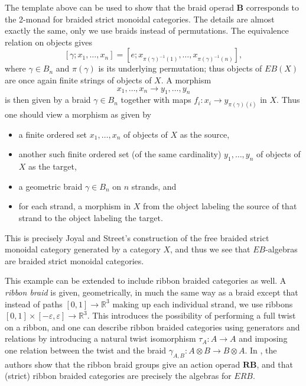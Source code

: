 \documentclass{amsbook} %
\newcommand{\mb}{\mathbf}
\numberwithin{section}{chapter}
\begin{document}
\begin{example}
The template above can be used to show that the braid operad $\mb{B}$ corresponds to the 2-monad for braided strict monoidal categories.  The details are almost exactly the same, only we use braids instead of permutations.  The equivalence relation on objects gives
\[
[\gamma; x_{1}, \ldots, x_{n}] = [e; x_{\pi(\gamma)^{-1}(1)}, \ldots, x_{\pi(\gamma)^{-1}(n)}],
\]
where $\gamma \in B_{n}$ and $\pi(\gamma)$ is its underlying permutation; thus objects of $EB(X)$ are once again finite strings of objects of $X$.  A morphism
\[
x_{1}, \ldots, x_{n} \rightarrow y_{1}, \ldots, y_{n}
\]
is then given by a braid $\gamma \in B_{n}$ together with maps $f_{i}:x_{i} \rightarrow y_{\pi(\gamma)(i)}$ in $X$.  Thus one should view a morphism as given by
\begin{itemize}
\item a finite ordered set $x_{1}, \ldots, x_{n}$ of objects of $X$ as the source,
\item another such finite ordered set (of the same cardinality) $y_{1}, \ldots, y_{n}$ of objects of $X$ as the target,
\item a geometric braid $\gamma \in B_{n}$ on $n$ strands, and
\item for each strand, a morphism in $X$ from the object labeling the source of that strand to the object labeling the target.
\end{itemize}
This is precisely Joyal and Street's \cite{js} construction of the free braided strict monoidal category generated by a category $X$, and thus we see that $EB$-algebras are braided strict monoidal categories.

This example can be extended to include ribbon braided categories as well.  A \textit{ribbon braid} is given, geometrically, in much the same way as a braid except that instead of paths $[0,1] \rightarrow \mathbb{R}^{3}$ making up each individual strand, we use ribbons
$[0,1] \times [-\varepsilon, \varepsilon] \rightarrow \mathbb{R}^{3}$.  This introduces the possibility of performing a full twist on a ribbon, and one can describe ribbon braided categories using generators and relations by introducing a natural twist isomorphism $\tau_{A}:A \rightarrow A$ and imposing one relation between the twist and the braid $\gamma_{A,B}:A \otimes B \rightarrow B \otimes A$.  In \cite{sal-wahl}, the authors show that the ribbon braid groups give an action operad $\mb{RB}$, and that (strict) ribbon braided categories are precisely the algebras for $ERB$.
\end{example}
\end{document}
